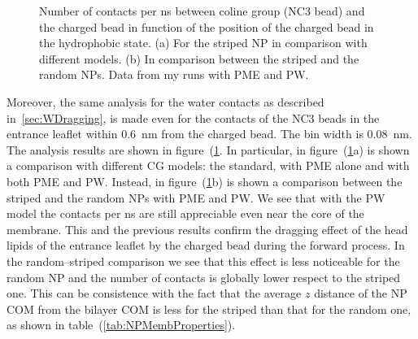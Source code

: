\begin{figure}
	\center
	\caption{Number of contacts per ns between coline group (NC3 bead) and the charged bead in function of the position of the charged bead in the hydrophobic state. (a) For the striped \acs{NP} in comparison with different models. (b) In comparison between the striped and the random \acs{NP}s. Data from my runs with \acs{PME} and \acs{PW}.}
	\label{fig:NC3Contact}
\end{figure}

Moreover, the same analysis for the water contacts as described in~\ref{sec:WDragging}, is made even for the contacts of the NC$3$ beads in the entrance leaflet within $0.6$~nm from the charged bead. The bin width is $0.08$~nm. The analysis results are shown in figure~(\ref{fig:NC3Contact}. In particular, in figure~(\ref{fig:NC3Contact}a) is shown a comparison with different \ac{CG} \martini models: the standard, with \ac{PME} alone and with both \ac{PME} and \ac{PW}. Instead, in figure~(\ref{fig:NC3Contact}b) is shown a comparison between the striped and the random \acp{NP} with \ac{PME} and \ac{PW}. We see that with the \ac{PW} model the contacts per ns are still appreciable even near the core of the membrane. This and the previous results confirm the dragging effect of the head lipids of the entrance leaflet by the charged bead during the forward process. In the random--striped comparison we see that this effect is less noticeable for the random \ac{NP} and the number of contacts is globally lower respect to the striped one. This can be consistence with the fact that the average $z$ distance of the \ac{NP} \ac{COM} from the bilayer \ac{COM} is less for the striped than that for the random one, as shown in table~(\ref{tab:NPMembProperties}). 

